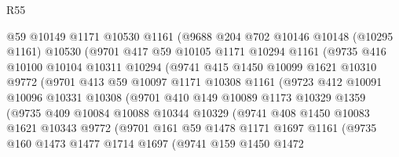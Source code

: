 \begin{lexlean}{R55}
\begin{coremodule}
              @59
              @10149
              @1171
              @10530
              @1161
              (@9688
                @204
                @702
                @10146
                @10148
                (@10295 @1161)
                @10530
                (@9701
                  @417
                  @59
                  @10105
                  @1171
                  @10294
                  @1161
                  (@9735
                    @416
                    @10100
                    @10104
                    @10311
                    @10294
                    (@9741
                      @415
                      @1450
                      @10099
                      @1621
                      @10310
                      @9772
                      (@9701
                        @413
                        @59
                        @10097
                        @1171
                        @10308
                        @1161
                        (@9723
                          @412
                          @10091
                          @10096
                          @10331
                          @10308
                          (@9701
                            @410
                            @149
                            @10089
                            @1173
                            @10329
                            @1359
                            (@9735
                              @409
                              @10084
                              @10088
                              @10344
                              @10329
                              (@9741
                                @408
                                @1450
                                @10083
                                @1621
                                @10343
                                @9772
                                (@9701
                                  @161
                                  @59
                                  @1478
                                  @1171
                                  @1697
                                  @1161
                                  (@9735
                                    @160
                                    @1473
                                    @1477
                                    @1714
                                    @1697
                                    (@9741
                                      @159
                                      @1450
                                      @1472

\end{coremodule}
\end{lexlean}
